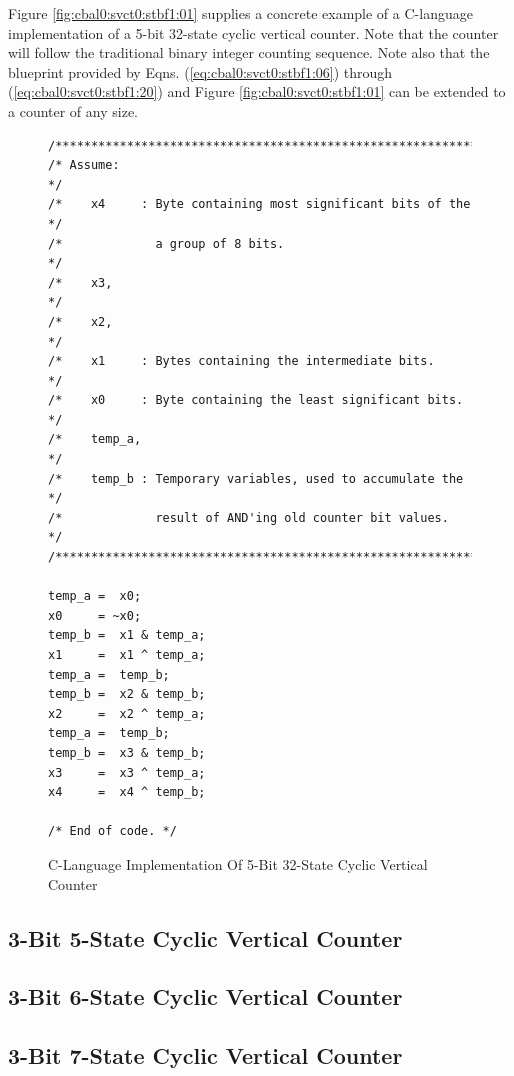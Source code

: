Figure \ref{fig:cbal0:svct0:stbf1:01} 
supplies a concrete example of a C-language
implementation of a 5-bit 32-state cyclic vertical counter.
Note that the counter will follow the traditional 
binary integer counting sequence.  Note also that
the blueprint provided by Eqns. 
(\ref{eq:cbal0:svct0:stbf1:06}) through (\ref{eq:cbal0:svct0:stbf1:20})
and Figure \ref{fig:cbal0:svct0:stbf1:01} can 
be extended to a counter of any size.

\begin{figure}
\begin{verbatim}
/**************************************************************/
/* Assume:                                                    */
/*    x4     : Byte containing most significant bits of the   */
/*             a group of 8 bits.                             */
/*    x3,                                                     */
/*    x2,                                                     */
/*    x1     : Bytes containing the intermediate bits.        */
/*    x0     : Byte containing the least significant bits.    */
/*    temp_a,                                                 */
/*    temp_b : Temporary variables, used to accumulate the    */
/*             result of AND'ing old counter bit values.      */
/**************************************************************/

temp_a =  x0;
x0     = ~x0;
temp_b =  x1 & temp_a;
x1     =  x1 ^ temp_a;
temp_a =  temp_b;
temp_b =  x2 & temp_b;
x2     =  x2 ^ temp_a;
temp_a =  temp_b;
temp_b =  x3 & temp_b;
x3     =  x3 ^ temp_a;
x4     =  x4 ^ temp_b;

/* End of code. */
\end{verbatim}
\caption{C-Language Implementation Of 5-Bit 32-State Cyclic Vertical Counter}
\label{fig:cbal0:svct0:stbf1:01b}
\end{figure}


\subsection{3-Bit 5-State Cyclic Vertical Counter}
\label{cbal0:svct0:stbf5}


\subsection{3-Bit 6-State Cyclic Vertical Counter}
\label{cbal0:svct0:stbf6}


\subsection{3-Bit 7-State Cyclic Vertical Counter}
\label{cbal0:svct0:stbf7}


